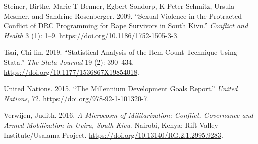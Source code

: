 \documentclass[
]{article}
\newlength{\cslhangindent}
\newenvironment{CSLReferences}[2] %
 {\begin{list}{}{%
  \setlength{\itemindent}{0pt}
  \setlength{\leftmargin}{0pt}
  \setlength{\parsep}{0pt}
  \ifodd #1
   \setlength{\leftmargin}{\cslhangindent}
   \setlength{\itemindent}{-1\cslhangindent}
  \fi
  \setlength{\itemsep}{#2\baselineskip}}}
 {\end{list}}
\begin{document}
\begin{CSLReferences}{1}{0}
Steiner, Birthe, Marie T Benner, Egbert Sondorp, K Peter Schmitz, Ursula
Mesmer, and Sandrine Rosenberger. 2009. {``Sexual Violence in the
Protracted Conflict of {DRC} Programming for Rape Survivors in {South
Kivu}.''} \emph{Conflict and Health} 3 (1): 1--9.
\url{https://doi.org/10.1186/1752-1505-3-3}.

Tsai, Chi-lin. 2019. {``Statistical Analysis of the Item-Count Technique
Using {Stata}.''} \emph{The Stata Journal} 19 (2): 390--434.
\url{https://doi.org/10.1177/1536867X19854018}.

United Nations. 2015. {``The {Millennium Development Goals Report}.''}
\emph{United Nations}, 72. \url{https://doi.org/978-92-1-101320-7}.

Verwijen, Judith. 2016. \emph{A {Microcosm} of {Militarization}:
{Conflict}, {Governance} and {Armed Mobilization} in {Uvira},
{South-Kivu}}. {Nairobi, Kenya}: {Rift Valley Institute/Usalama
Project}. \url{https://doi.org/10.13140/RG.2.1.2995.9283}.

\end{CSLReferences}
\end{document}
